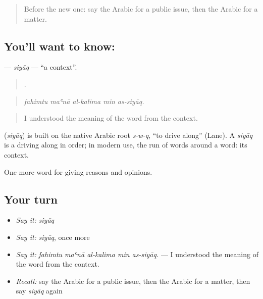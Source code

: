\label{lesson:AR-C361-siyaq}



\begin{quote}
Before the new one: say the Arabic for a public issue, then the Arabic for a matter.
\end{quote}

\subsection*{You'll want to know: }
\textbf{} — \emph{siyāq} — \textquotedblleft{}a context\textquotedblright{}.

\begin{quote}
    .
\end{quote}

\begin{quote}
\emph{fahimtu maʿnā al-kalima min as-siyāq.}
\end{quote}

\begin{quote}
I understood the meaning of the word from the context.
\end{quote}

\begin{cousinweb}
\textbf{} (\emph{siyāq}) is built on the native Arabic root \emph{s-w-q}, \textquotedblleft{}to drive along\textquotedblright{} (Lane). A \emph{siyāq} is a driving along in order; in modern use, the run of words around a word: its context.
\end{cousinweb}

\begin{grammarlens}[title={What you've built}]
One more word for giving reasons and opinions.
\end{grammarlens}

\subsection*{Your turn}
\begin{itemize}
\raggedright
  \item \emph{Say it:} \emph{siyāq}
  \item \emph{Say it:} \emph{siyāq}, once more
  \item \emph{Say it:} \emph{fahimtu maʿnā al-kalima min as-siyāq.} — I understood the meaning of the word from the context.
  \item \emph{Recall:} say the Arabic for a public issue, then the Arabic for a matter, then say \emph{siyāq} again
\end{itemize}

